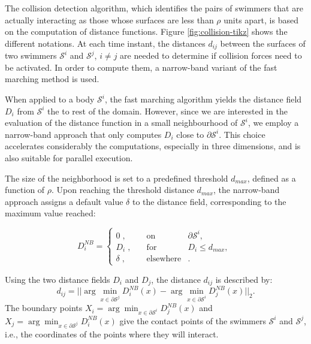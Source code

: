 \documentclass[graybox]{svmult}
\newcommand{\Solid}{\mathcal{S}} %
\begin{document}
The collision detection algorithm, which identifies the pairs of swimmers that are actually interacting as those whose surfaces are less than $\rho$ units apart, is based on the computation of distance functions. Figure \ref{fig:collision-tikz} shows the different notations. 
At each time instant, the distances $d_{ij}$ between the surfaces of two swimmers $\Solid^i$ and $\Solid^j$, $i \ne j$ are needed to determine if collision forces need to be activated. In order to compute them, a narrow-band variant of the fast marching method is used. 

When applied to a body $\Solid^i$, the  fast marching algorithm \cite{sethian} yields the distance field $D_i$ from $\Solid^i$ the to rest of the domain. However, since we are interested in the evaluation of the distance function in a small neighbourhood of $\Solid^i$, we employ a narrow-band approach that only computes $D_i$ close to $\partial \Solid^i$. This choice accelerates considerably the computations, especially in three dimensions, and is also suitable for parallel execution.

The size of the neighborhood is set to a predefined threshold $d_{max}$, defined as a function of $\rho$. Upon reaching the threshold distance $d_{max}$, the narrow-band 
approach assigns a default value $\delta$ to the distance field, corresponding to the maximum value reached:
\begin{center}
	\begin{equation*}
		D_i^{NB} = \left\{\begin{array}{rcl}
		0 \;, \quad &\mbox{on }& \partial \Solid^i , \\
		D_i \;, \quad &\mbox{for }& D_i \leq d_{max} ,\\
		\delta\;, \quad &\mbox{elsewhere}&   .
		\end{array}\right.\;
	\end{equation*}
\end{center}

Using the two distance fields $D_i$ and $D_j$, the distance $d_{ij}$ is described by:
$$
d_{ij} = ||\arg\min_{x \in \partial \Solid^j}  D_i^{NB}(x) - \arg\min_{x \in \partial \Solid^i} D_j^{NB}(x)||_2. 
$$
The boundary points $X_i = \arg\min_{x \in \partial \Solid^i} D_j^{NB}(x)$ and $X_j = \arg\min_{x \in \partial \Solid^j}  D_i^{NB}(x)$ 
give the contact points of the swimmers $\Solid^i$ and $\Solid^j$, i.e., the coordinates 
of the points where they will interact. 
\end{document}
